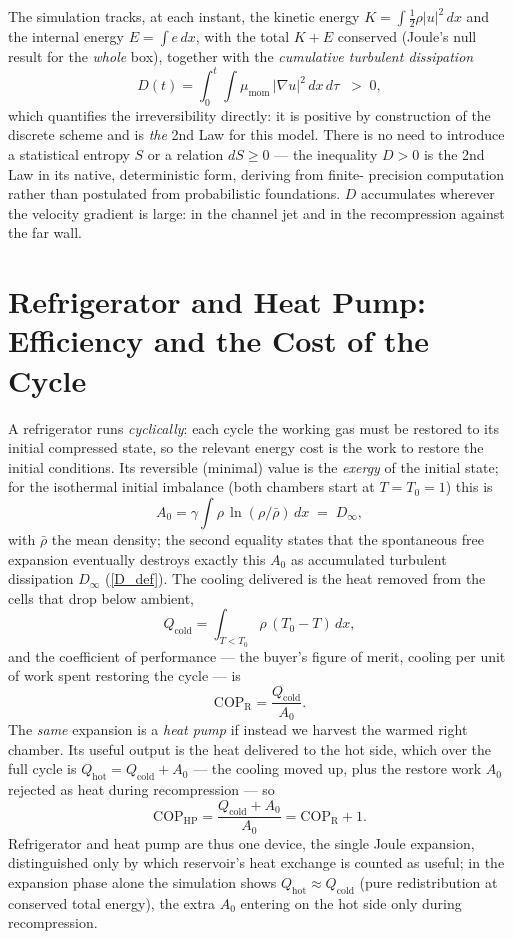 The simulation tracks, at each instant, the kinetic energy
$K=\int\tfrac12\rho|u|^2\,dx$ and the internal energy $E=\int e\,dx$, with the
total $K+E$ conserved (Joule's null result for the \emph{whole} box), together
with the \emph{cumulative turbulent dissipation}
\begin{equation}\label{D_def}
D(t)=\int_0^t\!\!\int \mu_{\mathrm{mom}}\,|\nabla u|^2\,dx\,d\tau \;\;>\;0 ,
\end{equation}
which quantifies the irreversibility directly: it is positive by construction of
the discrete scheme and is \emph{the} 2nd Law for this model. There is no need
to introduce a statistical entropy $S$ or a relation $dS\ge 0$ --- the inequality
$D>0$ is the 2nd Law in its native, deterministic form, deriving from finite-
precision computation rather than postulated from probabilistic foundations.
$D$ accumulates wherever the velocity gradient is large: in the channel jet and
in the recompression against the far wall.

\section{Refrigerator and Heat Pump: Efficiency and the Cost of the Cycle}

A refrigerator runs \emph{cyclically}: each cycle the working gas must be
restored to its initial compressed state, so the relevant energy cost is the
work to restore the initial conditions. Its reversible (minimal) value is the
\emph{exergy} of the initial state; for the isothermal initial imbalance (both
chambers start at $T=T_0=1$) this is
\begin{equation}\label{exergyA0}
A_0=\gamma\int \rho\,\ln(\rho/\bar\rho)\,dx \;=\; D_\infty ,
\end{equation}
with $\bar\rho$ the mean density; the second equality states that the spontaneous
free expansion eventually destroys exactly this $A_0$ as accumulated turbulent
dissipation $D_\infty$ (\ref{D_def}). The cooling delivered is the heat removed from the cells
that drop below ambient,
\[
Q_{\mathrm{cold}}=\int_{T<T_0}\rho\,(T_0-T)\,dx ,
\]
and the coefficient of performance --- the buyer's figure of merit, cooling per
unit of work spent restoring the cycle --- is
\begin{equation}\label{copjoule}
\mathrm{COP}_{\mathrm R}=\frac{Q_{\mathrm{cold}}}{A_0}.
\end{equation}
The \emph{same} expansion is a \emph{heat pump} if instead we harvest the warmed
right chamber. Its useful output is the heat delivered to the hot side, which
over the full cycle is $Q_{\mathrm{hot}}=Q_{\mathrm{cold}}+A_0$ --- the cooling
moved up, plus the restore work $A_0$ rejected as heat during recompression ---
so
\[
\mathrm{COP}_{\mathrm{HP}}=\frac{Q_{\mathrm{cold}}+A_0}{A_0}=\mathrm{COP}_{\mathrm R}+1 .
\]
Refrigerator and heat pump are thus one device, the single Joule expansion,
distinguished only by which reservoir's heat exchange is counted as useful; in
the expansion phase alone the simulation shows $Q_{\mathrm{hot}}\approx
Q_{\mathrm{cold}}$ (pure redistribution at conserved total energy), the extra
$A_0$ entering on the hot side only during recompression.

